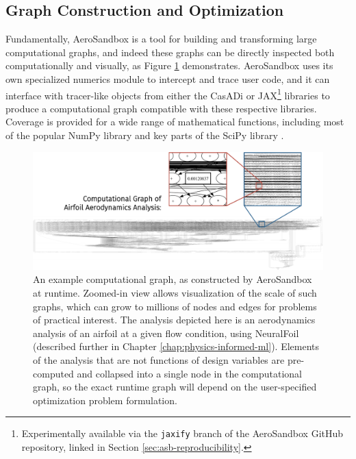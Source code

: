 \subsection{Graph Construction and Optimization}

Fundamentally, AeroSandbox is a tool for building and transforming large computational graphs, and indeed these graphs can be directly inspected both computationally and visually, as Figure \ref{fig:computational-graph-aerosandbox} demonstrates. AeroSandbox uses its own specialized numerics module to intercept and trace user code, and it can interface with tracer-like objects from either the CasADi \cite{casadi} or JAX\footnote{Experimentally available via the \texttt{jaxify} branch of the AeroSandbox GitHub repository, linked in Section \ref{sec:asb-reproducibility}.} \cite{jax} libraries to produce a computational graph compatible with these respective libraries. Coverage is provided for a wide range of mathematical functions, including most of the popular NumPy library \cite{harris_array_2020} and key parts of the SciPy library \cite{scipy}.

\begin{figure}[h]
    \centering
    \includegraphics[width=\textwidth]{../figures/large_computational_graph-crop.pdf} %
    \caption{An example computational graph, as constructed by AeroSandbox at runtime. Zoomed-in view allows visualization of the scale of such graphs, which can grow to millions of nodes and edges for problems of practical interest. The analysis depicted here is an aerodynamics analysis of an airfoil at a given flow condition, using NeuralFoil (described further in Chapter \ref{chap:physics-informed-ml}). Elements of the analysis that are not functions of design variables are pre-computed and collapsed into a single node in the computational graph, so the exact runtime graph will depend on the user-specified optimization problem formulation.}
    \label{fig:computational-graph-aerosandbox}
\end{figure}

